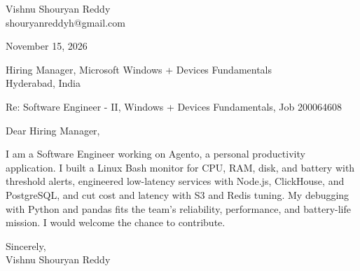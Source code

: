 \documentclass[a4paper,11pt]{article}
\begin{document}
\pagestyle{empty}
Vishnu Shouryan Reddy \\
shouryanreddyh@gmail.com

\vspace{1em}
November 15, 2026

\vspace{1em}
Hiring Manager, Microsoft Windows + Devices Fundamentals \\
Hyderabad, India

\vspace{1em}
Re: Software Engineer - II, Windows + Devices Fundamentals, Job 200064608

\vspace{1em}
Dear Hiring Manager,

\vspace{0.5em}
I am a Software Engineer working on Agento, a personal productivity application. I built a Linux Bash monitor for CPU, RAM, disk, and battery with threshold alerts, engineered low-latency services with Node.js, ClickHouse, and PostgreSQL, and cut cost and latency with S3 and Redis tuning. My debugging with Python and pandas fits the team's reliability, performance, and battery-life mission. I would welcome the chance to contribute.

\vspace{1em}
Sincerely, \\
Vishnu Shouryan Reddy
\end{document}
